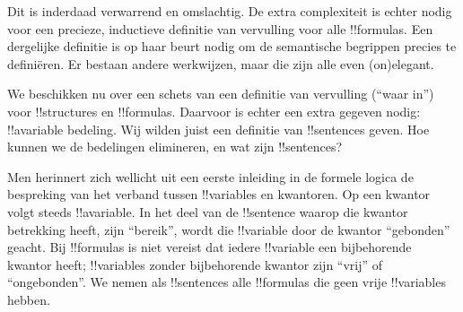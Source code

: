 \documentclass[openany]{memoir}
\begin{document}
Dit is inderdaad verwarrend en omslachtig. De extra complexiteit is
echter nodig voor een precieze, inductieve definitie van vervulling
voor alle !!{formula}s. Een dergelijke definitie is op haar beurt
nodig om de semantische begrippen precies te definiëren. Er bestaan
andere werkwijzen, maar die zijn alle even (on)elegant.
\endgroup

\begingroup
\def\olfilename{OLP-0144}
\def\olfilepath{content/first-order-logic/introduction/}
\hypertarget{unit-OLP-0144}{}





We beschikken nu over een schets van een definitie van vervulling
(``waar in'') voor !!{structure}s en !!{formula}s. Daarvoor is echter
een extra gegeven nodig: !!a{variable} bedeling. Wij wilden juist een
definitie van !!{sentence}s geven. Hoe kunnen we de bedelingen
elimineren, en wat zijn !!{sentence}s?

Men herinnert zich wellicht uit een eerste inleiding in de formele
logica de bespreking van het verband tussen !!{variable}s en
kwantoren. Op een kwantor volgt steeds !!a{variable}. In het deel van
de !!{sentence} waarop die kwantor betrekking heeft, zijn
``bereik'', wordt die !!{variable} door de kwantor ``gebonden''
geacht. Bij !!{formula}s is niet vereist dat iedere !!{variable} een
bijbehorende kwantor heeft; !!{variable}s zonder bijbehorende kwantor
zijn ``vrij'' of ``ongebonden''. We nemen als !!{sentence}s alle
!!{formula}s die geen vrije !!{variable}s hebben.
\end{document}
